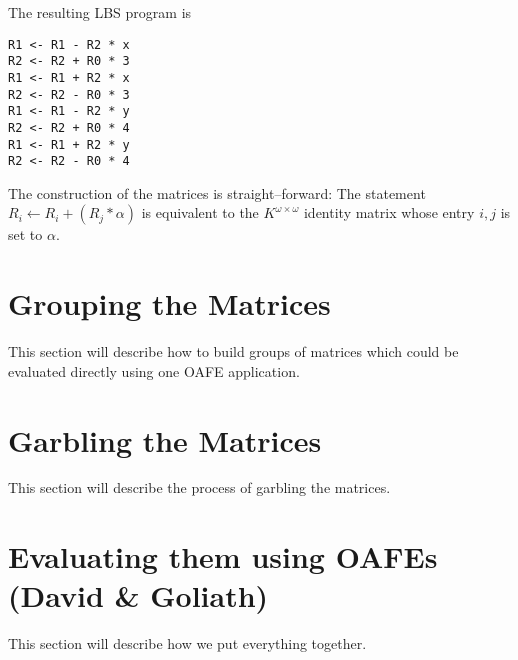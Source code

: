 \documentclass[12pt, a4paper]{article}
\begin{document}
The resulting LBS program is

\begin{lstlisting}
R1 <- R1 - R2 * x
R2 <- R2 + R0 * 3
R1 <- R1 + R2 * x
R2 <- R2 - R0 * 3
R1 <- R1 - R2 * y
R2 <- R2 + R0 * 4
R1 <- R1 + R2 * y
R2 <- R2 - R0 * 4
\end{lstlisting}

The construction of the matrices is straight--forward: The statement $R_i
\leftarrow R_i + (R_j * \alpha)$ is equivalent to the $K^{\omega \times \omega}$
identity matrix whose entry $i,j$ is set to $\alpha$.


\section{Grouping the Matrices}

This section will describe how to build groups of matrices which could be
evaluated directly using one OAFE application.


\section{Garbling the Matrices}

This section will describe the process of garbling the matrices.


\section{Evaluating them using OAFEs (David \& Goliath)}

This section will describe how we put everything together.


\end{document}
